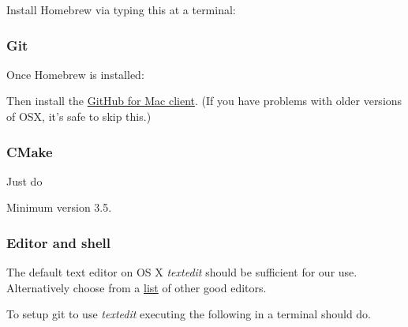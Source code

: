 Install Homebrew via typing this at a terminal:

\begin{Shaded}
\begin{Highlighting}[]
 \OtherTok{$(} \OtherTok{)}
\end{Highlighting}
\end{Shaded}

\subsubsection{Git}\label{git-3}

Once Homebrew is installed:

\begin{Shaded}
\begin{Highlighting}[]
 
\end{Highlighting}
\end{Shaded}

Then install the \href{http://mac.github.com}{GitHub for Mac client}.
(If you have problems with older versions of OSX, it's safe to skip
this.)

\subsubsection{CMake}\label{cmake-3}

Just do

\begin{Shaded}
\begin{Highlighting}[]
 
\end{Highlighting}
\end{Shaded}

Minimum version 3.5.

\subsubsection{Editor and shell}\label{editor-and-shell-1}

The default text editor on OS X \emph{textedit} should be sufficient for
our use. Alternatively choose from a
\href{http://mac.appstorm.net/roundups/office-roundups/top-10-mac-text-editors/}{list}
of other good editors.

To setup git to use \emph{textedit} executing the following in a
terminal should do.


